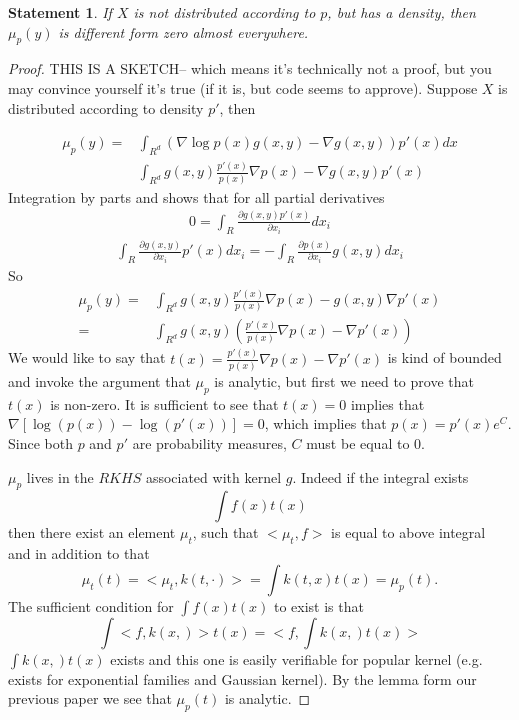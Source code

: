\documentclass{article}
\newtheorem{statement}{Statement}
\begin{document}
\begin{statement}
 If $X$ is not distributed according to $p$, but has a density, then $\mu_p(y)$ is different form zero almost everywhere. 
\end{statement}
\begin{proof}
THIS IS A SKETCH-- which means it's technically not a proof, but you may convince yourself it's true (if it is, but code seems to approve).
 Suppose $X$ is distributed according to density $p'$, then

\begin{align}
\mu_p(y) =& \int_{R^d} ( \nabla \log p(x) g(x,y) -  \nabla g(x,y)) p'(x) dx \\
          & \int_{R^d} g(x,y) \frac{ p'(x)}{p(x)} \nabla p(x) - \nabla g(x,y) p'(x)  
\end{align}
Integration by parts and shows that for all partial derivatives 
\begin{align}
0 = \int_{R} \frac{ \partial g(x,y)p'(x)} { \partial x_i } dx_i
\end{align}
\begin{align} 
 \int_{R} \frac{ \partial g(x,y) } { \partial x_i } p'(x) d x_i =
 -\int_{R} \frac{ \partial p(x) } { \partial x_i } g(x,y) d x_i 
\end{align}
So
\begin{align}
\mu_p(y) =& \int_{R^d} g(x,y) \frac{ p'(x)}{p(x)} \nabla p(x) -  g(x,y) \nabla p'(x)  \\
	 =& \int_{R^d} g(x,y) \left( \frac{ p'(x)}{p(x) } \nabla p(x) -  \nabla p'(x) \right)
\end{align}
 We would like to say that $t(x) = \frac{ p'(x)}{p(x) } \nabla p(x) -  \nabla p'(x)$  is kind of bounded and invoke the argument that $\mu_p$ is analytic, but first we need to prove that $t(x)$ is non-zero. 
 It is sufficient to see that $t(x) =0$ implies that $\nabla [ \log( p(x)) - \log( p'(x)) ]=0$, which implies that $p(x) = p'(x)e^C$. Since both $p$ and $p'$ are probability measures,  $C$ must be equal to 0.
 
 $\mu_p$ lives in the $RKHS$ associated with kernel $g$. Indeed if the integral exists 
 \[
  \int f(x) t(x) 
 \]
 then there exist an element $\mu_t$, such that $<\mu_t, f>$ is equal to above integral and in addition to that 
 \[
  \mu_t(t) = < \mu_t, k(t,\cdot)> = \int k(t,x) t(x) = \mu_p(t). 
 \]
The sufficient condition for $\int f(x) t(x)$ to exist is that 
\[
 \int <f, k(x,)> t(x) = < f, \int k(x,) t(x) > 
\]
$\int k(x,) t(x) $ exists and this one is easily verifiable for popular kernel (e.g. exists for exponential families and Gaussian kernel). By the lemma form our previous paper we see that $\mu_p(t)$ is  analytic. 
\end{proof}
\end{document}
